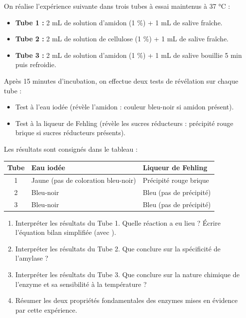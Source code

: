 \documentclass[11pt]{article}
\begin{document}
\begin{exercice}
On réalise l'expérience suivante dans trois tubes à essai maintenus à 37 °C :
\begin{itemize}
    \item \textbf{Tube 1 :} 2 mL de solution d'amidon (1 \%) + 1 mL de salive fraîche.
    \item \textbf{Tube 2 :} 2 mL de solution de cellulose (1 \%) + 1 mL de salive fraîche.
    \item \textbf{Tube 3 :} 2 mL de solution d'amidon (1 \%) + 1 mL de salive bouillie 5 min puis refroidie.
\end{itemize}
Après 15 minutes d'incubation, on effectue deux tests de révélation sur chaque tube :
\begin{itemize}
    \item Test à l'eau iodée (révèle l'amidon : couleur bleu-noir si amidon présent).
    \item Test à la liqueur de Fehling (révèle les sucres réducteurs : précipité rouge brique si sucres réducteurs présents).
\end{itemize}
Les résultats sont consignés dans le tableau :

\begin{center}
\begin{tabularx}{\linewidth}{|c|X|X|}\hline
\rowcolor{popblueL}
\textbf{Tube} & \textbf{Eau iodée} & \textbf{Liqueur de Fehling} \\ \hline
1 & Jaune (pas de coloration bleu-noir) & Précipité rouge brique \\ \hline
2 & Bleu-noir & Bleu (pas de précipité) \\ \hline
3 & Bleu-noir & Bleu (pas de précipité) \\ \hline
\end{tabularx}
\end{center}

\begin{enumerate}
    \item Interpréter les résultats du Tube 1. Quelle réaction a eu lieu ? Écrire l'équation bilan simplifiée (avec \ce{->}).
    \item Interpréter les résultats du Tube 2. Que conclure sur la spécificité de l'amylase ?
    \item Interpréter les résultats du Tube 3. Que conclure sur la nature chimique de l'enzyme et sa sensibilité à la température ?
    \item Résumer les deux propriétés fondamentales des enzymes mises en évidence par cette expérience.
\end{enumerate}
\end{exercice}
\end{document}
